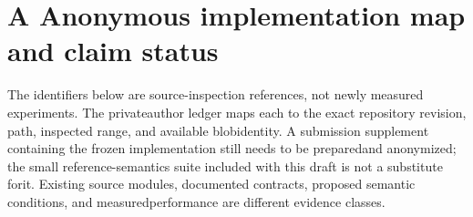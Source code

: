 \section*{A  Anonymous implementation map and claim status}
\noindent
The identifiers below are source-inspection references, not newly measured experiments. The private\linebreak[4]
author ledger maps each to the exact repository revision, path, inspected range, and available blob\linebreak[4]
identity. A submission supplement containing the frozen implementation still needs to be prepared\linebreak[4]
and anonymized; the small reference-semantics suite included with this draft is not a substitute for\linebreak[4]
it. Existing source modules, documented contracts, proposed semantic conditions, and measured\linebreak[4]
performance are different evidence classes.\par


